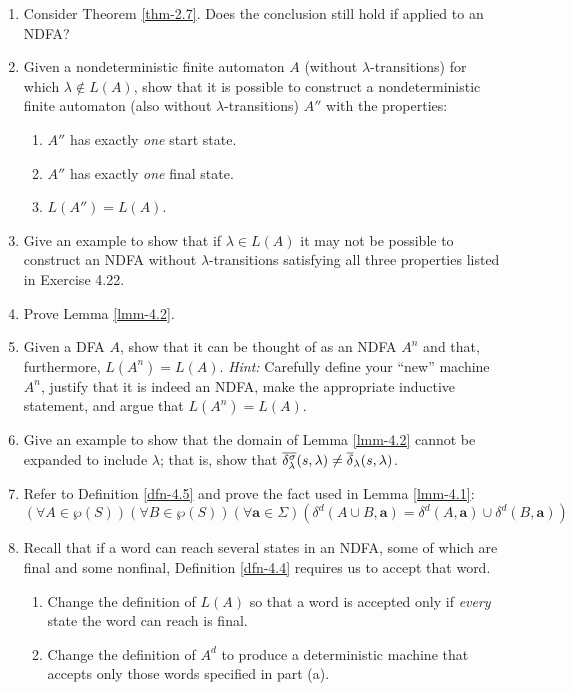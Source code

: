 \begin{enumerate}[{4.}1.]
\item Consider Theorem \ref{thm-2.7}. Does the conclusion still hold if applied to an
NDFA?

\item Given a nondeterministic finite automaton $A$ (without
$\lambda$-transitions) for which $\lambda \not \in L(A)$, show that it is possible
to construct a nondeterministic finite automaton (also without
$\lambda$-transitions) $A''$ with the properties:
\begin{enumerate}[1.]
\item $A''$ has exactly \emph{one} start state.
\item $A''$ has exactly \emph{one} final state.
\item $L(A'') = L(A)$.
\end{enumerate}

\item Give an example to show that if $\lambda \in L(A)$ it may not be possible
to construct an NDFA without $\lambda$-transitions satisfying all three
properties listed in Exercise 4.22.

\item Prove Lemma \ref{lmm-4.2}.

\item Given a DFA $A$, show that it can be thought of as an NDFA $A^n$ and that,
furthermore, $L(A^n) = L(A)$. \emph{Hint:} Carefully define your ``new'' machine
$A^n$, justify that it is indeed an NDFA, make the appropriate inductive
statement, and argue that $L(A^n) = L(A)$.

\item Give an example to show that the domain of Lemma \ref{lmm-4.2} cannot be expanded
to include $\lambda$; that is, show that $\overline{\delta^{\sigma}_{\lambda}}(s,\lambda)
\not= \overline{\delta}_{\lambda}(s,\lambda)$.

\item Refer to Definition \ref{dfn-4.5} and prove the fact used in Lemma \ref{lmm-4.1}:
\[ (\forall A \in \wp(S))(\forall B \in \wp(S))(\forall\pmb{a}\in\Sigma)(\delta^d
	(A \cup B,\pmb{a}) = \delta^d(A,\pmb{a}) \cup \delta^d(B,\pmb{a})) \]
	
\item Recall that if a word can reach several states in an NDFA, some of which
are final and some nonfinal, Definition \ref{dfn-4.4} requires us to accept that word.
\begin{enumerate}
\item Change the definition of $L(A)$ so that a word is accepted only if
\emph{every} state the word can reach is final.
\item Change the definition of $A^d$ to produce a deterministic machine that
accepts only those words specified in part (a).
\end{enumerate}


\end{enumerate}
